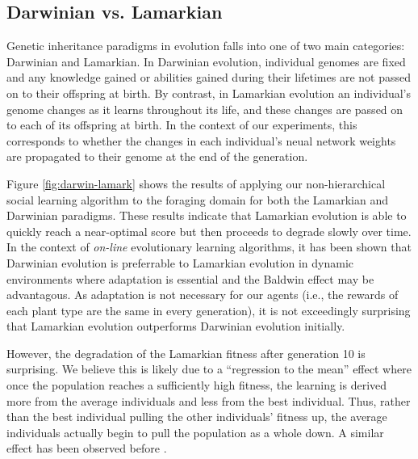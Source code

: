\documentclass{acm_proc_article-sp}
\begin{document}
\subsection*{Darwinian vs. Lamarkian}
Genetic inheritance paradigms in evolution falls into one of two main categories: Darwinian and Lamarkian. In Darwinian evolution, individual genomes are fixed and any knowledge gained or abilities gained during their lifetimes are not passed on to their offspring at birth. By contrast, in Lamarkian evolution an individual's genome changes as it learns throughout its life, and these changes are passed on to each of its offspring at birth. In the context of our experiments, this corresponds to whether the changes in each individual's neual network weights are propagated to their genome at the end of the generation.

Figure \ref{fig:darwin-lamark} shows the results of applying our non-hierarchical social learning algorithm to the foraging domain for both the Lamarkian and Darwinian paradigms. These results indicate that Lamarkian evolution is able to quickly reach a near-optimal score but then proceeds to degrade slowly over time. In the context of \textit{on-line} evolutionary learning algorithms, it has been shown \cite{whiteson2006evolutionary} that Darwinian evolution is preferrable to Lamarkian evolution in dynamic environments where adaptation is essential and the Baldwin effect \cite{simpson1953baldwin} may be advantagous. As adaptation is not necessary for our agents (i.e., the rewards of each plant type are the same in every generation), it is not exceedingly surprising that Lamarkian evolution outperforms Darwinian evolution initially.

However, the degradation of the Lamarkian fitness after generation 10 is surprising. We believe this is likely due to a ``regression to the mean'' effect where once the population reaches a sufficiently high fitness, the learning is derived more from the average individuals and less from the best individual. Thus, rather than the best individual pulling the other individuals' fitness up, the average individuals actually begin to pull the population as a whole down. A similar effect has been observed before \cite{denaro1996cultural}.
\end{document}
